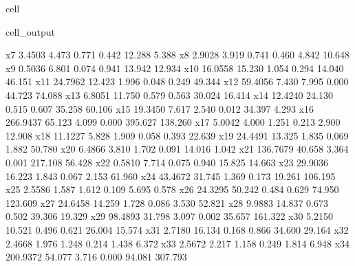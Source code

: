 \documentclass[letterpaper,10pt,english]{jupyterBook}
\begin{document}
\begin{sphinxuseclass}{cell}
\begin{sphinxVerbatimOutput}
\begin{sphinxuseclass}{cell_output}
\begin{sphinxVerbatim}[commandchars=\\\{\}]
x7            \PYGZhy{}3.4503      4.473     \PYGZhy{}0.771      0.442     \PYGZhy{}12.288       5.388
x8             2.9028      3.919      0.741      0.460      \PYGZhy{}4.842      10.648
x9            \PYGZhy{}0.5036      6.801     \PYGZhy{}0.074      0.941     \PYGZhy{}13.942      12.934
x10           16.0558     15.230      1.054      0.294     \PYGZhy{}14.040      46.151
x11           24.7962     12.423      1.996      0.048       0.249      49.344
x12           59.4056      7.430      7.995      0.000      44.723      74.088
x13           \PYGZhy{}6.8051     11.750     \PYGZhy{}0.579      0.563     \PYGZhy{}30.024      16.414
x14           12.4240     24.130      0.515      0.607     \PYGZhy{}35.258      60.106
x15          \PYGZhy{}19.3450      7.617     \PYGZhy{}2.540      0.012     \PYGZhy{}34.397      \PYGZhy{}4.293
x16         \PYGZhy{}266.9437     65.123     \PYGZhy{}4.099      0.000    \PYGZhy{}395.627    \PYGZhy{}138.260
x17            5.0042      4.000      1.251      0.213      \PYGZhy{}2.900      12.908
x18           11.1227      5.828      1.909      0.058      \PYGZhy{}0.393      22.639
x19           24.4491     13.325      1.835      0.069      \PYGZhy{}1.882      50.780
x20           \PYGZhy{}6.4866      3.810     \PYGZhy{}1.702      0.091     \PYGZhy{}14.016       1.042
x21         \PYGZhy{}136.7679     40.658     \PYGZhy{}3.364      0.001    \PYGZhy{}217.108     \PYGZhy{}56.428
x22           \PYGZhy{}0.5810      7.714     \PYGZhy{}0.075      0.940     \PYGZhy{}15.825      14.663
x23           29.9036     16.223      1.843      0.067      \PYGZhy{}2.153      61.960
x24           43.4672     31.745      1.369      0.173     \PYGZhy{}19.261     106.195
x25           \PYGZhy{}2.5586      1.587     \PYGZhy{}1.612      0.109      \PYGZhy{}5.695       0.578
x26           24.3295     50.242      0.484      0.629     \PYGZhy{}74.950     123.609
x27           24.6458     14.259      1.728      0.086      \PYGZhy{}3.530      52.821
x28           \PYGZhy{}9.9883     14.837     \PYGZhy{}0.673      0.502     \PYGZhy{}39.306      19.329
x29           98.4893     31.798      3.097      0.002      35.657     161.322
x30           \PYGZhy{}5.2150     10.521     \PYGZhy{}0.496      0.621     \PYGZhy{}26.004      15.574
x31           \PYGZhy{}2.7180     16.134     \PYGZhy{}0.168      0.866     \PYGZhy{}34.600      29.164
x32            2.4668      1.976      1.248      0.214      \PYGZhy{}1.438       6.372
x33            2.5672      2.217      1.158      0.249      \PYGZhy{}1.814       6.948
x34          200.9372     54.077      3.716      0.000      94.081     307.793

\end{sphinxVerbatim}
\end{sphinxuseclass}
\end{sphinxVerbatimOutput}
\end{sphinxuseclass}
\end{document}
